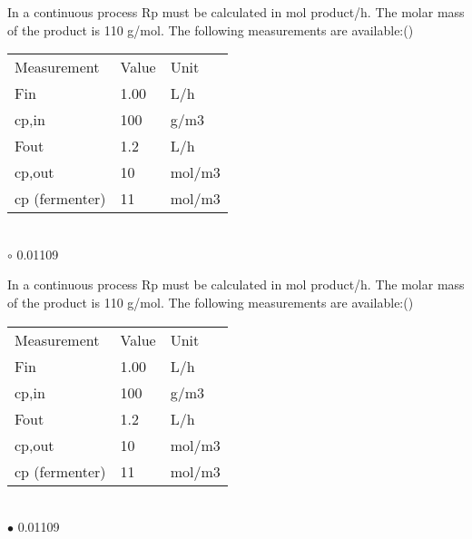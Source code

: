 \documentclass[]{beamer}
\begin{document}
\begin{frame}[shrink] {}
\addtocounter{questions}{1}
\color{blue}
In a continuous process Rp must be calculated in mol product/h. The molar mass of the product is 110 g/mol. The following measurements are available:({})\\[0.3em]
\color{gray}
\begin{tabular}[]{l l l}
Measurement & Value & Unit\\
Fin & 1.00 & L/h\\
cp,in& 	100& 	g/m3\\
Fout& 	1.2& 	L/h\\
cp,out&  	10 & 	mol/m3\\
cp (fermenter) & 11 & 	mol/m3\\
\end{tabular}\\[0.3em]
\color{black}
\setlength{\parindent}{-0.4cm}
{\color{red}$\circ$} 0.01109

\end{frame}
\begin{frame}[shrink] {}
\addtocounter{answers}{1}
\color{blue}
In a continuous process Rp must be calculated in mol product/h. The molar mass of the product is 110 g/mol. The following measurements are available:({})\\[0.3em]
\color{gray}
\begin{tabular}[]{l l l}
Measurement & Value & Unit\\
Fin & 1.00 & L/h\\
cp,in& 	100& 	g/m3\\
Fout& 	1.2& 	L/h\\
cp,out&  	10 & 	mol/m3\\
cp (fermenter) & 11 & 	mol/m3\\
\end{tabular}\\[0.3em]
\color{black}
\setlength{\parindent}{-0.4cm}
{\color{red}$\bullet$} 0.01109

\end{frame}
\end{document}

